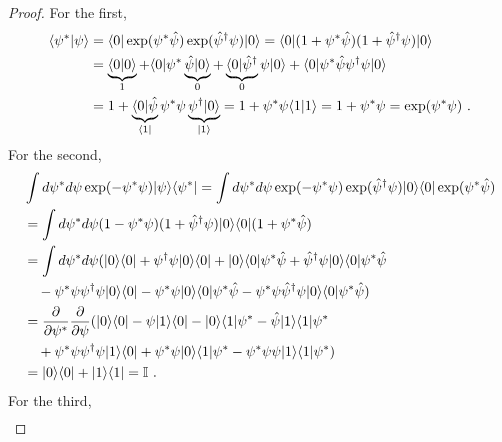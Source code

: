     \begin{proof}
        For the first, 
        \begin{equation*}
        \begin{aligned}
            \langle\psi^*\vert\psi\rangle & = \langle0\vert \exp(\psi^* \hat \psi) \exp(\hat \psi^\dagger \psi) \vert0\rangle = \langle0\vert (1 + \psi^* \hat \psi) (1 + \hat \psi^\dagger \psi) \vert0\rangle \\ & = \underbrace{\langle0\vert0\rangle}_1 + \langle0\vert \psi^* \underbrace{\hat \psi \vert0\rangle}_0 + \underbrace{\langle0\vert \hat \psi^\dagger}_0 \psi \vert0\rangle + \langle0\vert \psi^* \hat \psi \psi^\dagger \psi \vert0\rangle \\ & = 1 + \underbrace{\langle0\vert \hat \psi }_{\langle1\vert} \psi^* \psi \underbrace{\psi^\dagger \vert0\rangle}_{\vert1\rangle} = 1 + \psi^* \psi \langle1\vert1\rangle = 1 + \psi^* \psi = \exp(\psi^* \psi) ~.
        \end{aligned}
        \end{equation*}
        For the second,
        \begin{equation*}
        \begin{aligned}
            & \int d\psi^* d \psi \exp(- \psi^* \psi) \vert\psi\rangle \langle\psi^*\vert = \int d\psi^* d \psi \exp(- \psi^* \psi) \exp(\hat \psi^\dagger \psi) \vert0\rangle \langle0\vert \exp( \psi^* \hat \psi) \\ & = \int d\psi^* d\psi (1 - \psi^* \psi) (1 + \hat \psi^\dagger \psi) \vert0\rangle \langle0\vert (1 + \psi^* \hat \psi) \\ & = \int d\psi^* d\psi (\vert0\rangle \langle0\vert + \psi^\dagger \psi \vert0\rangle \langle0\vert + \vert0\rangle \langle0\vert \psi^* \hat \psi + \hat \psi^\dagger \psi \vert0\rangle \langle0\vert  \psi^* \hat \psi \\ & \quad - \psi^* \psi \psi^\dagger \psi \vert0\rangle \langle0\vert - \psi^* \psi \vert0\rangle \langle0\vert \psi^* \hat \psi - \psi^* \psi \hat \psi^\dagger \psi \vert0\rangle \langle0\vert  \psi^* \hat \psi) \\ & =  \frac{\partial}{\partial\psi^*} \frac{\partial}{\partial\psi} (\vert0\rangle \langle0\vert - \psi \vert1\rangle \langle0\vert - \vert0\rangle \langle1\vert \psi^* - \hat \psi \vert1\rangle \langle1\vert \psi^* \\ & \quad + \psi^* \psi \psi^\dagger \psi \vert1\rangle \langle0\vert + \psi^* \psi \vert0\rangle \langle1\vert \psi^* - \psi^* \psi \psi \vert1\rangle \langle1\vert \psi^*) \\ & = \vert0\rangle \langle0\vert + \vert1\rangle \langle1\vert = \mathbb I ~.
        \end{aligned}
        \end{equation*}
        For the third, 
        \begin{equation*}
        \begin{aligned}

\end{aligned}
\end{equation*}
\end{proof}

